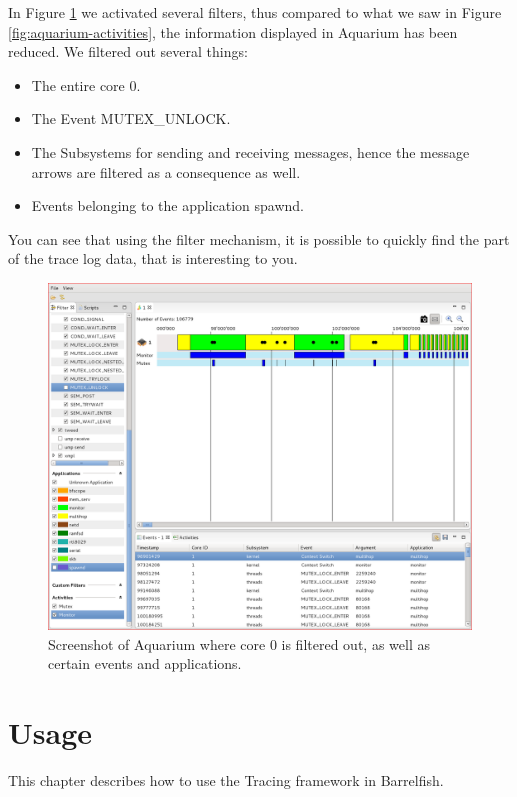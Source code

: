 \documentclass[a4paper,11pt,twoside]{report}
\begin{document}
In Figure \ref{fig:aquarium-filters} we activated several filters, thus compared
to what we saw in Figure \ref{fig:aquarium-activities}, the information
displayed in Aquarium has been reduced. We filtered out several things:

\begin{itemize}
	\item The entire core 0.
	\item The Event MUTEX\_UNLOCK.
	\item The Subsystems for sending and receiving messages, hence the message
		arrows are filtered as a consequence as well.
	\item Events belonging to the application spawnd.
\end{itemize}

You can see that using the filter mechanism, it is possible to quickly find the
part of the trace log data, that is interesting to you.

\begin{figure}[htb]
	\includegraphics[width=1\textwidth]{images/aquarium-filters.png}
	\caption{Screenshot of Aquarium where core 0 is filtered out, as well as
	certain events and applications.}
	\label{fig:aquarium-filters}
\end{figure}

\chapter{Usage}

This chapter describes how to use the Tracing framework in Barrelfish.
\end{document}
